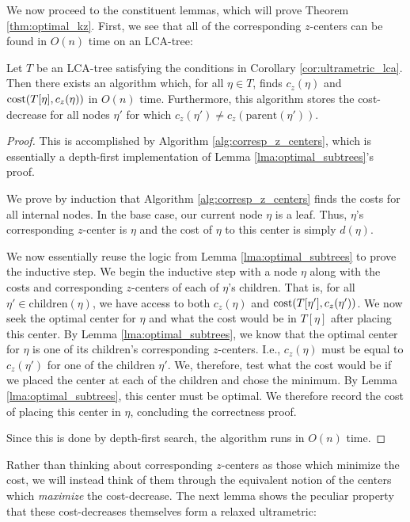 We now proceed to the constituent lemmas, which will prove Theorem \ref{thm:optimal_kz}. First, we see that all of the corresponding $z$-centers can be found in
$O(n)$ time on an LCA-tree:

\begin{lemma}
    \label{lma:cost_decreases_alg}
    Let $T$ be an LCA-tree satisfying the conditions in Corollary \ref{cor:ultrametric_lca}. Then there exists an algorithm which, for all $\eta \in T$, finds $c_z(\eta)$ and
    $\text{cost}(T[\eta], c_z(\eta))$ in $O(n)$ time. Furthermore, this algorithm stores the cost-decrease for all nodes $\eta'$ for which $c_z(\eta') \neq
    c_z(\text{parent}(\eta'))$.
\end{lemma}


\begin{proof}
    This is accomplished by Algorithm \ref{alg:corresp_z_centers}, which is essentially a depth-first implementation of Lemma \ref{lma:optimal_subtrees}'s
    proof.

    We prove by induction that Algorithm \ref{alg:corresp_z_centers} finds the costs for all internal nodes.  In the base case, our current node $\eta$ is
    a leaf. Thus, $\eta$'s corresponding $z$-center is $\eta$ and the cost of $\eta$ to this center is simply $d(\eta)$.

    We now essentially reuse the logic from Lemma \ref{lma:optimal_subtrees} to prove the inductive step. We begin the inductive step with a node $\eta$ along
    with the costs and corresponding $z$-centers of each of $\eta$'s children. That is, for all $\eta' \in \text{children}(\eta)$, we have access to both $c_z(\eta)$
    and $\text{cost}(T[\eta'], c_z(\eta'))$. We now seek the optimal center for $\eta$ and what the cost would be in $T[\eta]$ after placing this center. By Lemma
    \ref{lma:optimal_subtrees}, we know that the optimal center for $\eta$ is one of its children's corresponding $z$-centers. I.e., $c_z(\eta)$ must be equal
    to $c_z(\eta')$ for one of the children $\eta'$. We, therefore, test what the cost would be if we placed the center at each of the children and chose the
    minimum. By Lemma \ref{lma:optimal_subtrees}, this center must be optimal. We therefore record the cost of placing this center in $\eta$, concluding the
    correctness proof.

    Since this is done by depth-first search, the algorithm runs in $O(n)$ time.
\end{proof}


Rather than thinking about corresponding $z$-centers as those which minimize the cost, we will instead think of them through the equivalent notion of the
centers which \emph{maximize} the cost-decrease.  The next lemma shows the peculiar property that these cost-decreases themselves form a relaxed ultrametric:

